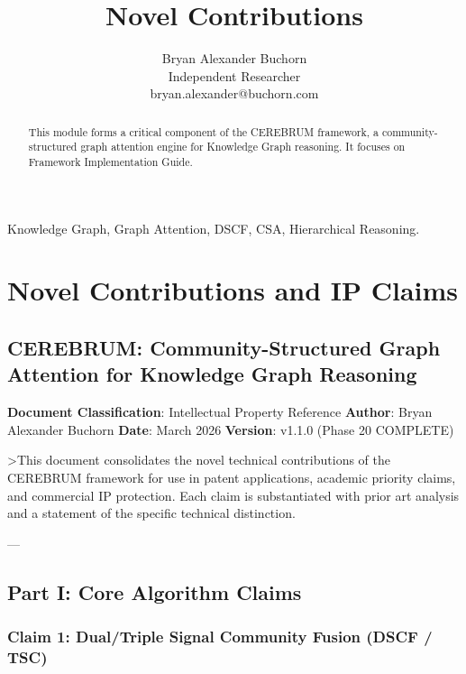 \documentclass[10pt,journal,compsoc]{IEEEtran}
\begin{document}
\title{Novel Contributions}
\author{Bryan Alexander Buchorn \\ Independent Researcher \\ bryan.alexander@buchorn.com}

\maketitle

\begin{abstract}
This module forms a critical component of the CEREBRUM framework, a community-structured graph attention engine for Knowledge Graph reasoning. It focuses on Framework Implementation Guide.
\end{abstract}

\begin{IEEEkeywords}
Knowledge Graph, Graph Attention, DSCF, CSA, Hierarchical Reasoning.
\end{IEEEkeywords}

\section{Novel Contri\-butions and IP Claims}

\subsection{CEREBRUM: Community-Structured Graph Attention for Knowledge Graph Reasoning}

\textbf{Document Classi\-fication}: Intell\-ectual Property Reference
\textbf{Author}: Bryan Alexander Buchorn
\textbf{Date}: March 2026
\textbf{Version}: v1.1.0 (Phase 20 COMPLETE)

\textgreater  This document conso\-lidates the novel technical contr\-ibutions of the CEREBRUM framework for use in patent appli\-cations, academic priority claims, and commercial IP protection. Each claim is subst\-antiated with prior art analysis and a statement of the specific technical distinction.

---

\subsection{Part I: Core Algorithm Claims}

\subsubsection{Claim 1: Dual/Triple Signal Community Fusion (DSCF / TSC)}
\end{document}
